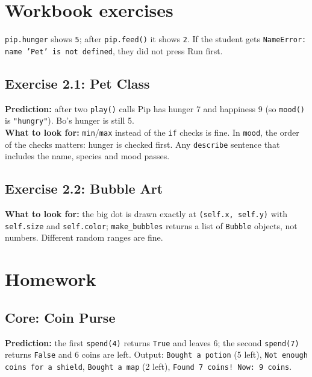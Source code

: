 
\section{Workbook exercises}
\begin{answer}
\texttt{pip.hunger} shows \texttt{5}; after \texttt{pip.feed()} it shows \texttt{2}. If the student gets \texttt{NameError: name 'Pet' is not defined}, they did not press Run first.
\end{answer}

\subsection{Exercise 2.1: Pet Class}
\begin{answer}
\textbf{Prediction:} after two \texttt{play()} calls Pip has hunger 7 and happiness 9 (so \texttt{mood()} is \texttt{"hungry"}). Bo's hunger is still 5.\\
\textbf{What to look for:} \texttt{min}/\texttt{max} instead of the \texttt{if} checks is fine. In \texttt{mood}, the order of the checks matters: hunger is checked first.
Any \texttt{describe} sentence that includes the name, species and mood passes.
\end{answer}

\subsection{Exercise 2.2: Bubble Art}
\begin{answer}
\textbf{What to look for:} the big dot is drawn exactly at \texttt{(self.x, self.y)} with \texttt{self.size} and \texttt{self.color}; \texttt{make\_bubbles} returns a list of \texttt{Bubble} objects, not numbers. Different random ranges are fine.
\end{answer}

\section{Homework}
\subsection{Core: Coin Purse}
\begin{answer}
\textbf{Prediction:} the first \texttt{spend(4)} returns \texttt{True} and leaves 6; the second \texttt{spend(7)} returns \texttt{False} and 6 coins are left.
Output: \texttt{Bought a potion} (5 left), \texttt{Not enough coins for a shield}, \texttt{Bought a map} (2 left), \texttt{Found 7 coins! Now: 9 coins}.
\end{answer}

